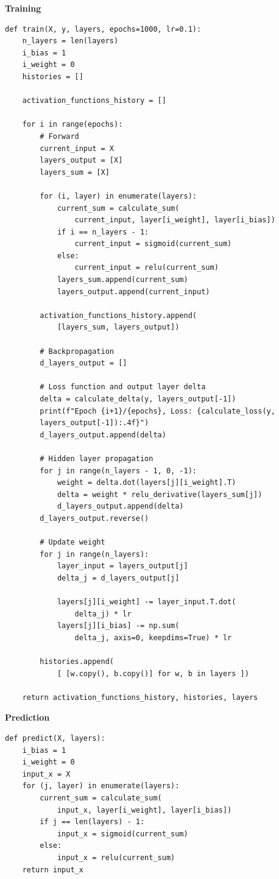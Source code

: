 \documentclass[a4paper,10pt]{article}
\begin{document}
\noindent
\textbf{Training}
\begin{verbatim}
def train(X, y, layers, epochs=1000, lr=0.1):
    n_layers = len(layers)
    i_bias = 1
    i_weight = 0
    histories = []
    
    activation_functions_history = []
    
    for i in range(epochs):
        # Forward
        current_input = X
        layers_output = [X]
        layers_sum = [X]
        
        for (i, layer) in enumerate(layers):
            current_sum = calculate_sum(
                current_input, layer[i_weight], layer[i_bias])
            if i == n_layers - 1:
                current_input = sigmoid(current_sum)
            else:
                current_input = relu(current_sum)
            layers_sum.append(current_sum)
            layers_output.append(current_input)
        
        activation_functions_history.append(
            [layers_sum, layers_output])

        # Backpropagation
        d_layers_output = []
        
        # Loss function and output layer delta
        delta = calculate_delta(y, layers_output[-1])
        print(f"Epoch {i+1}/{epochs}, Loss: {calculate_loss(y, 
        layers_output[-1]):.4f}")
        d_layers_output.append(delta)
        
        # Hidden layer propagation
        for j in range(n_layers - 1, 0, -1):
            weight = delta.dot(layers[j][i_weight].T)
            delta = weight * relu_derivative(layers_sum[j])
            d_layers_output.append(delta)
        d_layers_output.reverse()
        
        # Update weight
        for j in range(n_layers):
            layer_input = layers_output[j]
            delta_j = d_layers_output[j]
            
            layers[j][i_weight] -= layer_input.T.dot(
                delta_j) * lr
            layers[j][i_bias] -= np.sum(
                delta_j, axis=0, keepdims=True) * lr
        
        histories.append(
            [ [w.copy(), b.copy()] for w, b in layers ])
        
    return activation_functions_history, histories, layers
\end{verbatim}

\noindent
\textbf{Prediction}
\begin{verbatim}
def predict(X, layers):
    i_bias = 1
    i_weight = 0
    input_x = X
    for (j, layer) in enumerate(layers):
        current_sum = calculate_sum(
            input_x, layer[i_weight], layer[i_bias])
        if j == len(layers) - 1:
            input_x = sigmoid(current_sum)
        else:
            input_x = relu(current_sum)
    return input_x
\end{verbatim}
\end{document}
